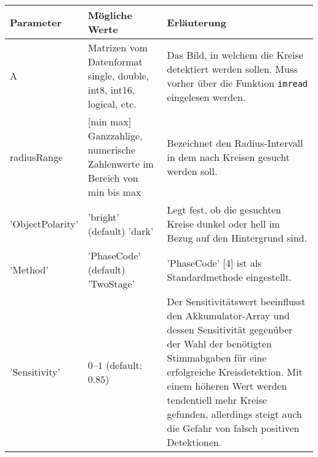 \begin{tabular}{lp{4cm}p{7cm}}
		\toprule
		Parameter				&Mögliche Werte						&Erläuterung	\\
		\midrule
			A					&Matrizen vom Datenformat single, double, int8, int16, logical, etc.					&Das Bild, in welchem die Kreise detektiert werden sollen. Muss vorher über die Funktion \lstinline|imread| eingelesen werden.\\
			radiusRange			&[min max] Ganzzahlige, numerische Zahlenwerte im Bereich von min bis max		&Bezeichnet den Radius-Intervall in dem nach Kreisen gesucht werden soll.\\
			'ObjectPolarity'		&'bright' (default) 	\newline 'dark'			&Legt fest, ob die gesuchten Kreise dunkel oder hell im Bezug auf den Hintergrund sind.\\
			'Method'				&'PhaseCode' (default)	\newline 'TwoStage'	&'PhaseCode' [4] ist als Standardmethode eingestellt.\\ 
			'Sensitivity'		&$0$–$1$	 (default: $0.85$)					&Der Sensitivitätswert beeinflusst den Akkumulator-Array und dessen Sensitivität gegenüber der Wahl der benötigten Stimmabgaben für eine erfolgreiche Kreisdetektion. Mit einem höheren Wert werden tendentiell mehr Kreise gefunden, allerdings steigt auch die Gefahr von falsch positiven Detektionen.\\
		\bottomrule
	\end{tabular}